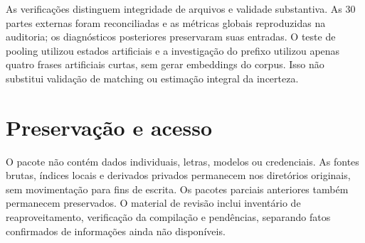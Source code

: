 As verificações distinguem integridade de arquivos e validade substantiva. As 30 partes externas foram reconciliadas e as métricas globais reproduzidas na auditoria; os diagnósticos posteriores preservaram suas entradas. O teste de pooling utilizou estados artificiais e a investigação do prefixo utilizou apenas quatro frases artificiais curtas, sem gerar embeddings do corpus. Isso não substitui validação de matching ou estimação integral da incerteza.

\section{Preservação e acesso}
O pacote não contém dados individuais, letras, modelos ou credenciais. As fontes brutas, índices locais e derivados privados permanecem nos diretórios originais, sem movimentação para fins de escrita. Os pacotes parciais anteriores também permanecem preservados. O material de revisão inclui inventário de reaproveitamento, verificação da compilação e pendências, separando fatos confirmados de informações ainda não disponíveis.
